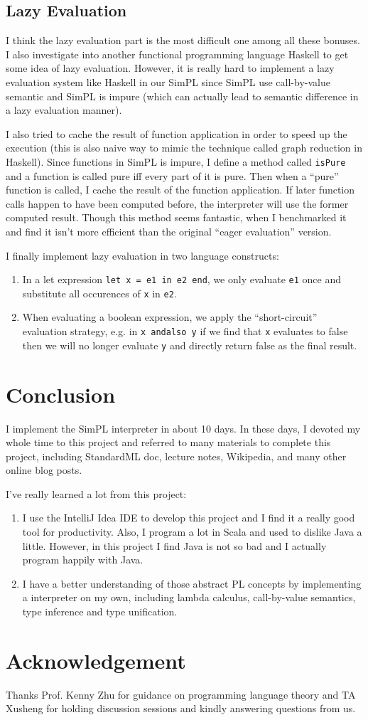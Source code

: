 \documentclass{article}
\begin{document}
\subsection{Lazy Evaluation}
I think the lazy evaluation part is the most difficult one among all these bonuses. I also investigate into another functional programming language Haskell to get some idea of lazy evaluation. However, it is really hard to implement a lazy evaluation system like Haskell in our SimPL since SimPL use call-by-value semantic and SimPL is impure (which can actually lead to semantic difference in a lazy evaluation manner).

I also tried to cache the result of function application in order to speed up the execution (this is also naive way to mimic the technique called graph reduction in Haskell). Since functions in SimPL is impure, I define a method called \verb|isPure| and a function is called pure iff every part of it is pure. Then when a ``pure'' function is called, I cache the result of the function application. If later function calls happen to have been computed before, the interpreter will use the former computed result. Though this method seems fantastic, when I benchmarked it and find it isn't more efficient than the original ``eager evaluation'' version.

I finally implement lazy evaluation in two language constructs:
\begin{enumerate}
	\item In a let expression \verb|let x = e1 in e2 end|, we only evaluate \verb|e1| once and substitute all occurences of \verb|x| in \verb|e2|.
	\item When evaluating a boolean expression, we apply the ``short-circuit'' evaluation strategy, e.g. in \verb|x andalso y| if we find that \verb|x| evaluates to false then we will no longer evaluate \verb|y| and directly return false as the final result.
\end{enumerate}

\section{Conclusion}
I implement the SimPL interpreter in about 10 days. In these days, I devoted my whole time to this project and referred to many materials to complete this project, including StandardML doc, lecture notes, Wikipedia, and many other online blog posts.

I've really learned a lot from this project:
\begin{enumerate}
	\item I use the IntelliJ Idea IDE to develop this project and I find it a really good tool for productivity. Also, I program a lot in Scala and used to dislike Java a little. However, in this project I find Java is not so bad and I actually program happily with Java.
	\item I have a better understanding of those abstract PL concepts by implementing a interpreter on my own, including lambda calculus, call-by-value semantics, type inference and type unification.
\end{enumerate}






\section*{Acknowledgement}
Thanks Prof. Kenny Zhu for guidance on programming language theory and TA Xusheng for holding discussion sessions and kindly answering questions from us.
\end{document}
